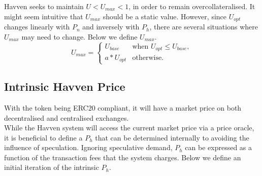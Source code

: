 \noindent Havven seeks to maintain $U < U_{max} < 1$, in order to remain overcollateralised. It might seem intuitive that $U_{max}$ should be a static value. However, since $U_{opt}$ changes linearly with $P_n$ and inversely with $P_h$, there are several situations where $U_{max}$ may need to change. Below we define $U_{max}$. \\

\[
U_{max} = 
\begin{cases}
 U_{base} &\mbox{when } U_{opt} \leq U_{base}, \\[1em]
 a * U_{opt} &\mbox{otherwise}.
 \end{cases}
\]

\begin{center}
\end{center}

\newpage

\subsection{Intrinsic Havven Price} With the \HAV{} token being ERC20 compliant, it will have a market price on both decentralised and centralised exchanges. \\

\noindent While the Havven system will access the current market price via a price oracle, it is beneficial to define a $P_h$ that can be determined internally to avoiding the influence of speculation. Ignoring speculative demand, $P_h$ can be expressed as a function of the transaction fees that the system charges. Below we define an initial iteration of the intrinsic $P_h$.

